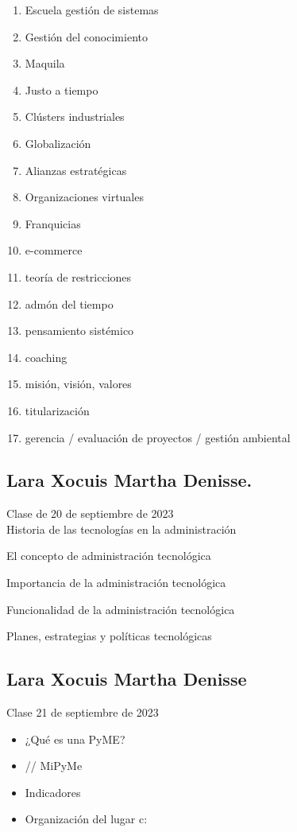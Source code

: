 \documentclass[letterpaper,12pt]{article}
\begin{document}
\begin{sloppypar}
\begin{enumerate}
    \item Escuela gestión de sistemas
    \item Gestión del conocimiento 
    \item Maquila 
    \item Justo a tiempo 
    \item Clústers industriales 
    \item Globalización 
    \item Alianzas estratégicas 
    \item Organizaciones virtuales 
    \item Franquicias
    \item e-commerce 
    \item teoría de restricciones 
    \item admón del tiempo 
    \item pensamiento sistémico 
    \item coaching 
    \item misión, visión, valores 
    \item titularización 
    \item gerencia / evaluación de proyectos / gestión ambiental 
\end{enumerate}

\newpage
\subsection*{Lara Xocuis Martha Denisse.}
Clase de 20 de septiembre de 2023
\vspace{0.3cm}\\ 
Historia de las tecnologías en la administración

El concepto de administración tecnológica

Importancia de la administración tecnológica

Funcionalidad de la administración tecnológica

Planes, estrategias y políticas tecnológicas

\newpage
\subsection*{Lara Xocuis Martha Denisse}
Clase 21 de septiembre de 2023

\begin{itemize}
    \item ¿Qué es una PyME? 
    \item // MiPyMe 
    \item Indicadores
    \item Organización del lugar c: 
\end{itemize}


\end{sloppypar}
\end{document}
